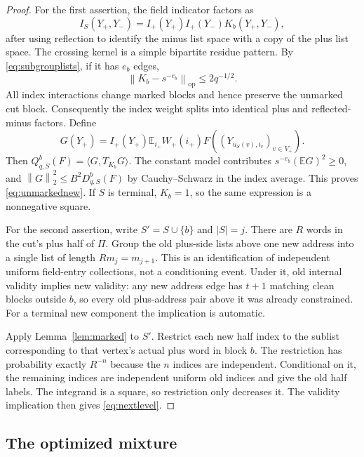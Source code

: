 \documentclass[11pt,a4paper]{article}
\numberwithin{equation}{section}
\theoremstyle{definition}
\theoremstyle{remark}
\newcommand{\E}{\mathbb E}
\newcommand{\op}{\mathrm{op}}
\newcommand{\norm}[1]{\left\lVert #1\right\rVert}
\begin{document}
\begin{proof}
For the first assertion, the field indicator factors as
\[
 I_S(Y_+,Y_-)=I_+(Y_+)I_+(Y_-)K_b(Y_+,Y_-),
\]
after using reflection to identify the minus list space with a copy of
the plus list space. The crossing kernel is a simple bipartite residue
pattern. By \eqref{eq:subgrouplists}, if it has $e_b$ edges,
\[
 \norm{K_b-s^{-e_b}}_{\op}\le2q^{-1/2}.
\]
All index interactions change marked blocks and hence preserve the
unmarked cut block. Consequently the index weight splits into identical
plus and reflected-minus factors. Define
\[
 G(Y_+)=I_+(Y_+)\E_{i_+}W_+(i_+)
                   F((Y_{u_S(v),i_v})_{v\in V_+}).
\]
Then $Q_{q,S}^b(F)=\langle G,T_{K_b}G\rangle$. The constant model
contributes $s^{-e_b}(\E G)^2\ge0$, and
$\norm G_2^2\le B^2D_{q,S}^b(F)$ by Cauchy--Schwarz in the index
average. This proves \eqref{eq:unmarkednew}. If $S$ is terminal,
$K_b=1$, so the same expression is a nonnegative square.

For the second assertion, write $S'=S\cup\{b\}$ and $|S|=j$.
There are $R$ words in the cut's plus half of $\Pi$. Group the old
plus-side lists above one new address into a single list of length
$Rm_j=m_{j+1}$. This is an identification of independent uniform
field-entry collections, not a conditioning event. Under it, old
internal validity implies new validity: any new address edge has
$t+1$ matching clean blocks outside $b$, so every old plus-address
pair above it was already constrained. For a terminal new component
the implication is automatic.

Apply Lemma~\ref{lem:marked} to $S'$. Restrict each new half index to
the sublist corresponding to that vertex's actual plus word in block
$b$. The restriction has probability exactly $R^{-n}$ because the
$n$ indices are independent. Conditional on it, the remaining indices
are independent uniform old indices and give the old half labels.
The integrand is a square, so restriction only decreases it. The
validity implication then gives \eqref{eq:nextlevel}.
\end{proof}

\subsection{The optimized mixture}
\end{document}
